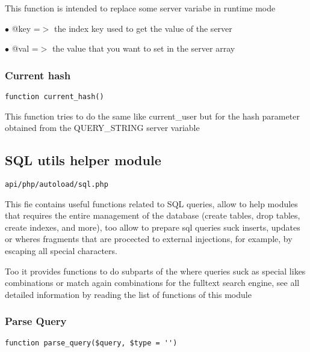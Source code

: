 \documentclass[a4paper]{article}
\begin{document}
This function is intended to replace some server variabe in runtime mode

\begin{compactitem}
\item[\color{myblue}$\bullet$] @key =$>$ the index key used to get the value of the server
\item[\color{myblue}$\bullet$] @val =$>$ the value that you want to set in the server array
\end{compactitem}

\hypertarget{toc213}{}
\subsubsection{Current hash}

\begin{lstlisting}
function current_hash()
\end{lstlisting}

This function tries to do the same like current\_user but for the hash parameter
obtained from the QUERY\_STRING server variable

\hypertarget{toc214}{}
\subsection{SQL utils helper module}

\begin{lstlisting}
api/php/autoload/sql.php
\end{lstlisting}

This fie contains useful functions related to SQL queries, allow to help modules that requires
the entire management of the database (create tables, drop tables, create indexes, and more),
too allow to prepare sql queries suck inserts, updates or wheres fragments that are procected
to external injections, for example, by escaping all special characters.

Too it provides functions to do subparts of the where queries suck as special likes combinations
or match again combinations for the fulltext search engine, see all detailed information by
reading the list of functions of this module

\hypertarget{toc215}{}
\subsubsection{Parse Query}

\begin{lstlisting}
function parse_query($query, $type = '')
\end{lstlisting}
\end{document}
